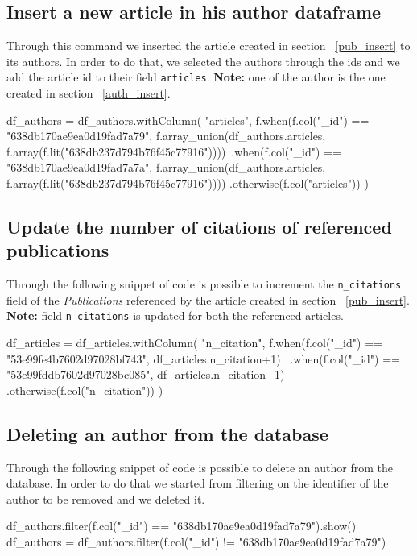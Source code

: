 \documentclass{Configuration_Files/PoliMi3i_thesis}
\begin{document}
\subsection{Insert a new article in his author dataframe}
Through this command we inserted the article created in section ~\ref{pub_insert} to its authors. In order to do that, we
selected the authors through the ids and we add the article id to their field \verb |articles|.\newline
\textbf{Note:} one of the author is the one created in section ~\ref{auth_insert}.\newline
\begin{python}
df_authors = df_authors.withColumn(
    "articles",
    f.when(f.col("_id") == "638db170ae9ea0d19fad7a79",
        f.array_union(df_authors.articles, f.array(f.lit("638db237d794b76f45c77916"))))\
    .when(f.col("_id") == "638db170ae9ea0d19fad7a7a",
        f.array_union(df_authors.articles, f.array(f.lit("638db237d794b76f45c77916"))))
    .otherwise(f.col("articles"))
)
\end{python}

\subsection{Update the number of citations of referenced publications}
Through the following snippet of code is possible to increment the \verb |n_citations| field of the \emph{Publications}
referenced by the article created in section ~\ref{pub_insert}.\newline
\textbf{Note:} field \verb |n_citations| is updated for both the referenced articles.\newline
\begin{python}
df_articles = df_articles.withColumn(
    "n_citation",
    f.when(f.col("_id") == "53e99fe4b7602d97028bf743",
        df_articles.n_citation+1) \
    .when(f.col("_id") == "53e99fddb7602d97028bc085",
        df_articles.n_citation+1)
    .otherwise(f.col("n_citation"))
)
\end{python}

\subsection{Deleting an author from the database}
Through the following snippet of code is possible to delete an author from the database. In order to do that we started from
filtering on the identifier of the author to be removed and we deleted it. \newline
\begin{python}
df_authors.filter(f.col("_id") == "638db170ae9ea0d19fad7a79").show()
df_authors = df_authors.filter(f.col("_id") != "638db170ae9ea0d19fad7a79")
\end{python}
\end{document}
